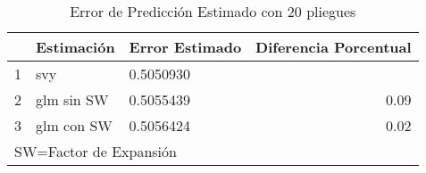 \begin{table}[H]
\centering
\begin{tabular}{rllr}
  \toprule
 & Estimación & Error Estimado & Diferencia Porcentual \\ 
  \midrule
1 & svy & 0.5050930 &  \\ 
  2 & glm sin SW & 0.5055439 & 0.09 \\ 
  3 & glm con SW & 0.5056424 & 0.02 \\ 
   \bottomrule
\multicolumn{4}{l}{\rule{0em}{2.5ex}SW=Factor de Expansión}\\
\end{tabular}
\caption{Error de Predicción Estimado con 20 pliegues} 
\end{table}

